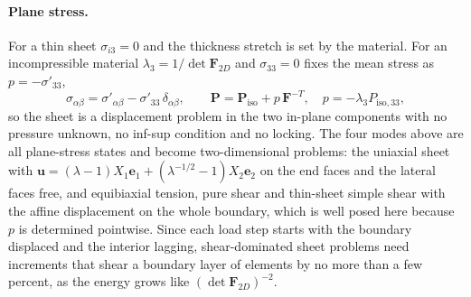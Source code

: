 \documentclass[11pt]{article}
\newcommand{\bu}{\bm{u}}
\newcommand{\be}{\bm{e}}
\newcommand{\bP}{\bm{P}}
\newcommand{\bF}{\bm{F}}
\begin{document}
\paragraph{Plane stress.}
For a thin sheet $\sigma_{i3} = 0$ and the thickness stretch is set by the
material.  For an incompressible material $\lambda_3 = 1/\det\bF_{2D}$ and
$\sigma_{33} = 0$ fixes the mean stress as $p = -\sigma'_{33}$,
\begin{equation}
  \sigma_{\alpha\beta} = \sigma'_{\alpha\beta} - \sigma'_{33}\,\delta_{\alpha\beta},
  \qquad
  \bP = \bP_{\mathrm{iso}} + p\,\bF^{-T}, \quad p = -\lambda_3 P_{\mathrm{iso},33},
\end{equation}
so the sheet is a displacement problem in the two in-plane components with
no pressure unknown, no inf-sup condition and no locking.  The four modes
above are all plane-stress states and become two-dimensional problems: the
uniaxial sheet with
$\bu = (\lambda - 1)X_1\be_1 + (\lambda^{-1/2} - 1)X_2\be_2$ on the end faces
and the lateral faces free, and equibiaxial tension, pure shear and
thin-sheet simple shear with the affine displacement on the whole boundary,
which is well posed here because $p$ is determined pointwise.  Since each
load step starts with the boundary displaced and the interior lagging,
shear-dominated sheet problems need increments that shear a boundary layer
of elements by no more than a few percent, as the energy grows like
$(\det\bF_{2D})^{-2}$.
\end{document}
